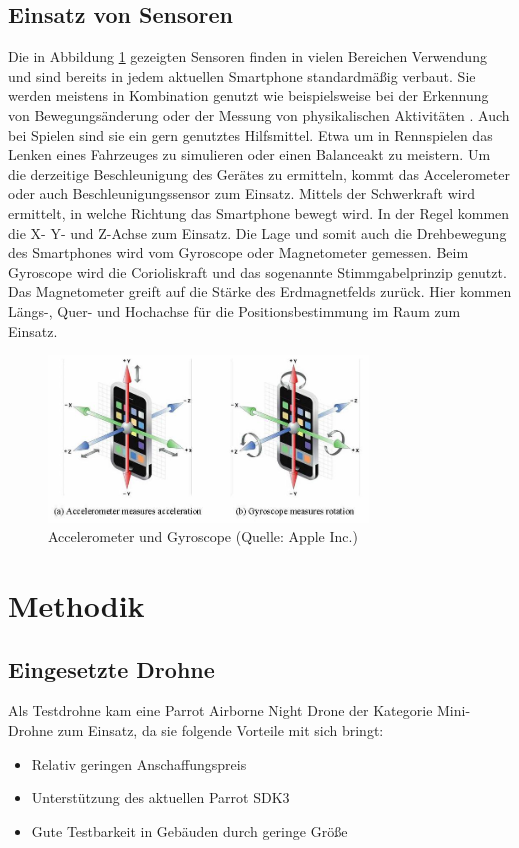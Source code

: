 \documentclass{article}
\begin{document}
\subsection{Einsatz von Sensoren}
Die in Abbildung \ref{fig:gyro} gezeigten Sensoren finden in vielen Bereichen Verwendung und sind bereits in jedem aktuellen Smartphone standardmäßig verbaut. 
Sie werden meistens in Kombination genutzt wie beispielsweise bei der Erkennung von Bewegungsänderung oder der Messung von physikalischen Aktivitäten \cite{wu2012classification}. Auch bei Spielen sind sie ein gern genutztes Hilfsmittel. Etwa um in Rennspielen das Lenken eines Fahrzeuges zu simulieren oder einen Balanceakt zu meistern.
Um die derzeitige Beschleunigung des Gerätes zu ermitteln, kommt das Accelerometer oder auch Beschleunigungssensor zum Einsatz. Mittels der Schwerkraft wird ermittelt, in welche Richtung das Smartphone bewegt wird. In der Regel kommen die X- Y- und Z-Achse zum Einsatz. Die Lage und somit auch die Drehbewegung des Smartphones wird vom Gyroscope oder Magnetometer gemessen. Beim Gyroscope wird die Corioliskraft und das sogenannte Stimmgabelprinzip genutzt. Das Magnetometer greift auf die Stärke des Erdmagnetfelds zurück. Hier kommen Längs-, Quer- und Hochachse für die Positionsbestimmung im Raum zum Einsatz.
\begin{figure}
\begin{minipage}[b]{1.0\linewidth}
  \centering
\centerline{\includegraphics[width= 85mm]{gyro.jpg}}
\end{minipage}
\caption{Accelerometer und Gyroscope (Quelle: Apple Inc.)}
\label{fig:gyro}
\end{figure}

\section{Methodik}

\subsection{Eingesetzte Drohne}
Als Testdrohne kam eine Parrot Airborne Night Drone der Kategorie Mini-Drohne zum Einsatz\cite{minidrone}, da sie folgende Vorteile mit sich bringt:
\begin{itemize}
	\item Relativ geringen Anschaffungspreis
	\item Unterstützung des aktuellen Parrot SDK3
	\item Gute Testbarkeit in Gebäuden durch geringe Größe 
\end{itemize}
\end{document}
